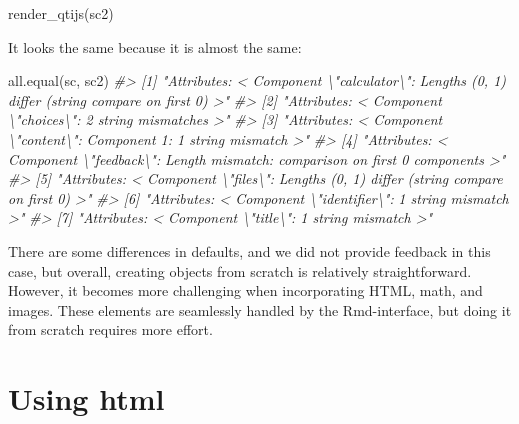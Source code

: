 \documentclass[twoside]{tufte-book}
\newenvironment{Shaded}{}{}
\newcommand{\CommentTok}[1]{\textcolor[rgb]{0.38,0.63,0.69}{\textit{#1}}}
\newcommand{\FunctionTok}[1]{\textcolor[rgb]{0.02,0.16,0.49}{#1}}
\newcommand{\NormalTok}[1]{#1}
\begin{document}
\begin{Shaded}
\begin{Highlighting}[]
\FunctionTok{render\_qtijs}\NormalTok{(sc2)}
\end{Highlighting}
\end{Shaded}

It looks the same because it is almost the same:

\begin{Shaded}
\begin{Highlighting}[]
\FunctionTok{all.equal}\NormalTok{(sc, sc2)}
\CommentTok{\#\textgreater{} [1] "Attributes: \textless{} Component \textbackslash{}"calculator\textbackslash{}":}
\CommentTok{ Lengths (0, 1) differ (string compare on first 0) \textgreater{}"}
\CommentTok{\#\textgreater{} [2] "Attributes: \textless{} Component \textbackslash{}"choices\textbackslash{}": 2 string mismatches \textgreater{}"                                 }
\CommentTok{\#\textgreater{} [3] "Attributes: \textless{} Component \textbackslash{}"content\textbackslash{}":}
\CommentTok{ Component 1: 1 string mismatch \textgreater{}"                      }
\CommentTok{\#\textgreater{} [4] "Attributes: \textless{} Component \textbackslash{}"feedback\textbackslash{}":}
\CommentTok{ Length mismatch: comparison on first 0 components \textgreater{}"  }
\CommentTok{\#\textgreater{} [5] "Attributes: \textless{} Component \textbackslash{}"files\textbackslash{}":}
\CommentTok{ Lengths (0, 1) differ (string compare on first 0) \textgreater{}"     }
\CommentTok{\#\textgreater{} [6] "Attributes: \textless{} Component \textbackslash{}"identifier\textbackslash{}":} \CommentTok{ 1 string mismatch \textgreater{}"                                }
\CommentTok{\#\textgreater{} [7] "Attributes: \textless{} Component \textbackslash{}"title\textbackslash{}": 1 string mismatch \textgreater{}"}
\end{Highlighting}
\end{Shaded}

There are some differences in defaults, and we did not provide feedback in this case, but overall, creating objects from scratch is relatively straightforward. However, it becomes more challenging when incorporating HTML, math, and images. These elements are seamlessly handled by the Rmd-interface, but doing it from scratch requires more effort.

\section{Using html}\label{using-html}
\end{document}
